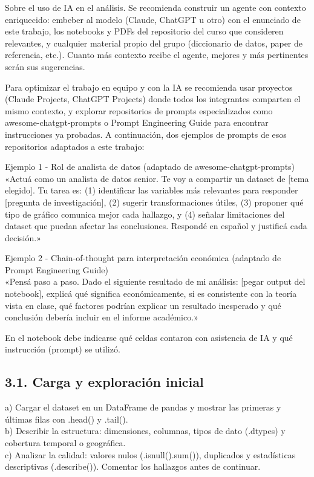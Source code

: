 \documentclass[10pt]{article}
\begin{document}
Sobre el uso de IA en el análisis. Se recomienda construir un agente con contexto enriquecido: embeber al modelo (Claude, ChatGPT u otro) con el enunciado de este trabajo, los notebooks y PDFs del repositorio del curso que consideren relevantes, y cualquier material propio del grupo (diccionario de datos, paper de referencia, etc.). Cuanto más contexto recibe el agente, mejores y más pertinentes serán sus sugerencias.

Para optimizar el trabajo en equipo y con la IA se recomienda usar proyectos (Claude Projects, ChatGPT Projects) donde todos los integrantes comparten el mismo contexto, y explorar repositorios de prompts especializados como awesome-chatgpt-prompts o Prompt Engineering Guide para encontrar instrucciones ya probadas. A continuación, dos ejemplos de prompts de esos repositorios adaptados a este trabajo:

Ejemplo 1 - Rol de analista de datos (adaptado de awesome-chatgpt-prompts)\\[0pt]
«Actuá como un analista de datos senior. Te voy a compartir un dataset de [tema elegido]. Tu tarea es: (1) identificar las variables más relevantes para responder [pregunta de investigación], (2) sugerir transformaciones útiles, (3) proponer qué tipo de gráfico comunica mejor cada hallazgo, y (4) señalar limitaciones del dataset que puedan afectar las conclusiones. Respondé en español y justificá cada decisión.»

Ejemplo 2 - Chain-of-thought para interpretación económica (adaptado de Prompt Engineering Guide)\\[0pt]
«Pensá paso a paso. Dado el siguiente resultado de mi análisis: [pegar output del notebook], explicá qué significa económicamente, si es consistente con la teoría vista en clase, qué factores podrían explicar un resultado inesperado y qué conclusión debería incluir en el informe académico.»

En el notebook debe indicarse qué celdas contaron con asistencia de IA y qué instrucción (prompt) se utilizó.

\subsection*{3.1. Carga y exploración inicial}
a) Cargar el dataset en un DataFrame de pandas y mostrar las primeras y últimas filas con .head() y .tail().\\
b) Describir la estructura: dimensiones, columnas, tipos de dato (.dtypes) y cobertura temporal o geográfica.\\
c) Analizar la calidad: valores nulos (.isnull().sum()), duplicados y estadísticas descriptivas (.describe()). Comentar los hallazgos antes de continuar.
\end{document}
